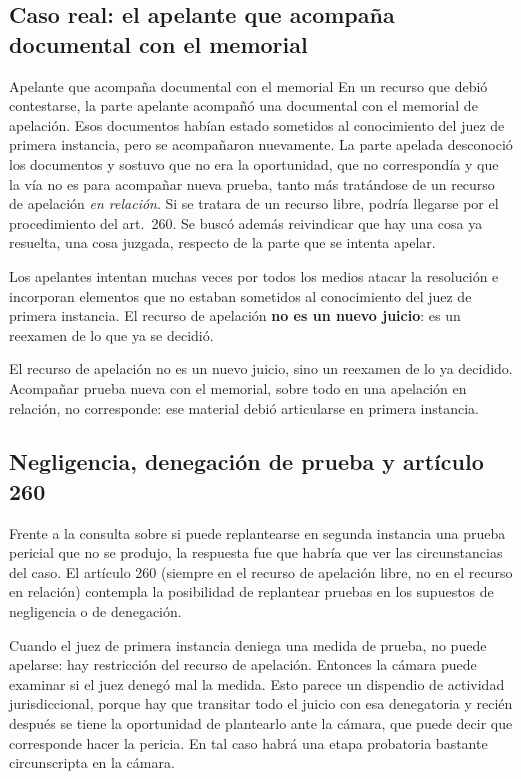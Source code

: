 \documentclass[12pt,oneside]{book}
\begin{document}
\subsection{Caso real: el apelante que acompaña documental con el memorial}

\begin{example}{Apelante que acompaña documental con el memorial}
En un recurso que debió contestarse, la parte apelante acompañó una documental con el memorial de apelación. Esos documentos habían estado sometidos al conocimiento del juez de primera instancia, pero se acompañaron nuevamente. La parte apelada desconoció los documentos y sostuvo que no era la oportunidad, que no correspondía y que la vía no es para acompañar nueva prueba, tanto más tratándose de un recurso de apelación \emph{en relación}. Si se tratara de un recurso libre, podría llegarse por el procedimiento del art.~260. Se buscó además reivindicar que hay una cosa ya resuelta, una cosa juzgada, respecto de la parte que se intenta apelar.
\end{example}

Los apelantes intentan muchas veces por todos los medios atacar la resolución e incorporan elementos que no estaban sometidos al conocimiento del juez de primera instancia. El recurso de apelación \textbf{no es un nuevo juicio}: es un reexamen de lo que ya se decidió.

\begin{important}
El recurso de apelación no es un nuevo juicio, sino un reexamen de lo ya decidido. Acompañar prueba nueva con el memorial, sobre todo en una apelación en relación, no corresponde: ese material debió articularse en primera instancia.
\end{important}

\subsection{Negligencia, denegación de prueba y artículo 260}

Frente a la consulta sobre si puede replantearse en segunda instancia una prueba pericial que no se produjo, la respuesta fue que habría que ver las circunstancias del caso. El artículo 260 (siempre en el recurso de apelación libre, no en el recurso en relación) contempla la posibilidad de replantear pruebas en los supuestos de negligencia o de denegación.

Cuando el juez de primera instancia deniega una medida de prueba, no puede apelarse: hay restricción del recurso de apelación. Entonces la cámara puede examinar si el juez denegó mal la medida. Esto parece un dispendio de actividad jurisdiccional, porque hay que transitar todo el juicio con esa denegatoria y recién después se tiene la oportunidad de plantearlo ante la cámara, que puede decir que corresponde hacer la pericia. En tal caso habrá una etapa probatoria bastante circunscripta en la cámara.
\end{document}

